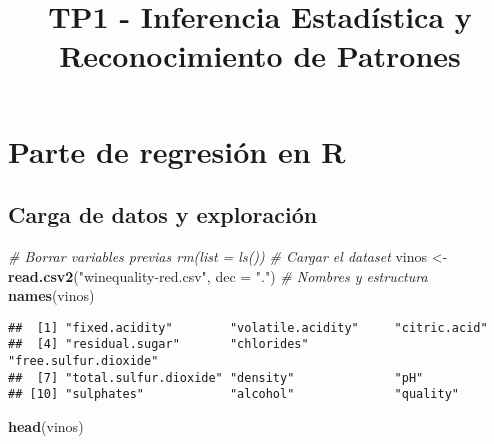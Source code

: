 \documentclass[
]{article}
\title{TP1 - Inferencia Estadística y Reconocimiento de Patrones}
\author{}
\date{\vspace{-2.5em}}
\newenvironment{Shaded}{\begin{snugshade}}{\end{snugshade}}
\newcommand{\AttributeTok}[1]{\textcolor[rgb]{0.13,0.29,0.53}{#1}}
\newcommand{\CommentTok}[1]{\textcolor[rgb]{0.56,0.35,0.01}{\textit{#1}}}
\newcommand{\FunctionTok}[1]{\textcolor[rgb]{0.13,0.29,0.53}{\textbf{#1}}}
\newcommand{\NormalTok}[1]{#1}
\newcommand{\OtherTok}[1]{\textcolor[rgb]{0.56,0.35,0.01}{#1}}
\newcommand{\StringTok}[1]{\textcolor[rgb]{0.31,0.60,0.02}{#1}}
\begin{document}
\maketitle

\hypertarget{parte-de-regresiuxf3n-en-r}{%
\section{Parte de regresión en R}\label{parte-de-regresiuxf3n-en-r}}

\hypertarget{carga-de-datos-y-exploraciuxf3n}{%
\subsection{Carga de datos y
exploración}\label{carga-de-datos-y-exploraciuxf3n}}

\begin{Shaded}
\begin{Highlighting}[]
\CommentTok{\# Borrar variables previas  rm(list = ls())}
\CommentTok{\# Cargar el dataset}
\NormalTok{vinos }\OtherTok{\textless{}{-}} \FunctionTok{read.csv2}\NormalTok{(}\StringTok{"winequality{-}red.csv"}\NormalTok{, }\AttributeTok{dec =} \StringTok{"."}\NormalTok{)}
\CommentTok{\# Nombres y estructura}
\FunctionTok{names}\NormalTok{(vinos)}
\end{Highlighting}
\end{Shaded}

\begin{verbatim}
##  [1] "fixed.acidity"        "volatile.acidity"     "citric.acid"         
##  [4] "residual.sugar"       "chlorides"            "free.sulfur.dioxide" 
##  [7] "total.sulfur.dioxide" "density"              "pH"                  
## [10] "sulphates"            "alcohol"              "quality"
\end{verbatim}

\begin{Shaded}
\begin{Highlighting}[]
\FunctionTok{head}\NormalTok{(vinos)}
\end{Highlighting}
\end{Shaded}
\end{document}
